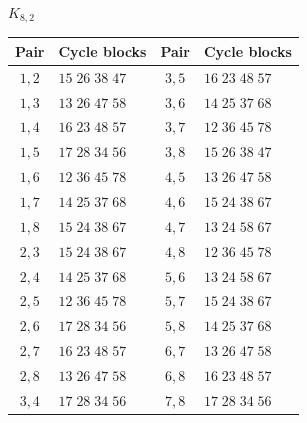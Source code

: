 \documentclass[11pt,a4paper]{article}
\theoremstyle{plain}
\theoremstyle{definition}
\numberwithin{equation}{section}
\begin{document}
\begin{center}\small
$K_{8,2}$\par\nopagebreak[4]\smallskip\nopagebreak[4]
\begin{tabular}{cl@{\qquad}cl}\toprule Pair&Cycle blocks&Pair&Cycle blocks\\\midrule
$1,2$ & $15\;26\;38\;47$ & $3,5$ & $16\;23\;48\;57$ \\
$1,3$ & $13\;26\;47\;58$ & $3,6$ & $14\;25\;37\;68$ \\
$1,4$ & $16\;23\;48\;57$ & $3,7$ & $12\;36\;45\;78$ \\
$1,5$ & $17\;28\;34\;56$ & $3,8$ & $15\;26\;38\;47$ \\
$1,6$ & $12\;36\;45\;78$ & $4,5$ & $13\;26\;47\;58$ \\
$1,7$ & $14\;25\;37\;68$ & $4,6$ & $15\;24\;38\;67$ \\
$1,8$ & $15\;24\;38\;67$ & $4,7$ & $13\;24\;58\;67$ \\
$2,3$ & $15\;24\;38\;67$ & $4,8$ & $12\;36\;45\;78$ \\
$2,4$ & $14\;25\;37\;68$ & $5,6$ & $13\;24\;58\;67$ \\
$2,5$ & $12\;36\;45\;78$ & $5,7$ & $15\;24\;38\;67$ \\
$2,6$ & $17\;28\;34\;56$ & $5,8$ & $14\;25\;37\;68$ \\
$2,7$ & $16\;23\;48\;57$ & $6,7$ & $13\;26\;47\;58$ \\
$2,8$ & $13\;26\;47\;58$ & $6,8$ & $16\;23\;48\;57$ \\
$3,4$ & $17\;28\;34\;56$ & $7,8$ & $17\;28\;34\;56$ \\
\bottomrule\end{tabular}
\end{center}
\end{document}
